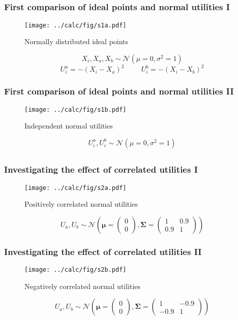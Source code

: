 \documentclass{beamer}
\begin{document}
\subsection{}
\begin{frame}%
  \frametitle{First comparison of ideal points and normal utilities I}
  \begin{figure}[ht]\centering
    \texttt{[image: ../calc/fig/s1a.pdf]}
    \caption{Normally distributed ideal points}
  \end{figure}
  $$X_i,X_a,X_b \sim \mathcal{N}(\mu=0,\sigma^2=1)$$
  $$U^a_i = -(X_i - X_a)^2 \hspace{1cm} U^b_i = -(X_i - X_b)^2$$
\end{frame}
\begin{frame}%
  \frametitle{First comparison of ideal points and normal utilities II}
  \begin{figure}[ht]\centering
    \texttt{[image: ../calc/fig/s1b.pdf]}
    \caption{Independent normal utilities}
  \end{figure}
  $$U^a_i,U^b_i \sim \mathcal{N}(\mu=0,\sigma^2=1)$$
\end{frame}

\subsection{}
\begin{frame}%
  \frametitle{Investigating the effect of correlated utilities I}
  \begin{figure}[ht]\centering
    \texttt{[image: ../calc/fig/s2a.pdf]}
    \caption{Positively correlated normal utilities}
  \end{figure}
  $$U_a,U_b \sim \mathcal{N}\left(
    \mathbf{\mu}=\begin{pmatrix}0 \\ 0\end{pmatrix},
    \mathbf{\Sigma}=\begin{pmatrix}1 & 0.9 \\ 0.9 & 1\end{pmatrix}
    \right)$$
\end{frame}
\begin{frame}%
  \frametitle{Investigating the effect of correlated utilities II}
  \begin{figure}[ht]\centering
    \texttt{[image: ../calc/fig/s2b.pdf]}
    \caption{Negatively correlated normal utilities}
  \end{figure}
  $$ U_a, U_b \sim \mathcal{N}\left(
    \mathbf{\mu}=\begin{pmatrix}0 \\ 0\end{pmatrix},
    \mathbf{\Sigma}=\begin{pmatrix}1 & -0.9 \\ -0.9 & 1\end{pmatrix}
    \right)$$
\end{frame}
\end{document}
